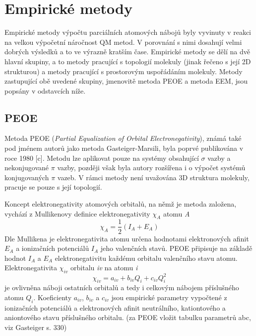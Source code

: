 \section{Empirické metody}
Empirické metody výpočtu parciálních atomových nábojů byly vyvinuty v reakci na velkou výpočetní náročnost QM metod. V porovnání s nimi dosahují velmi dobrých výsledků a to ve výrazně kratším čase. Empirické metody se dělí na dvě hlavní skupiny, a to metody pracující s topologií molekuly (jinak řečeno s její 2D strukturou) a metody pracující s prostorovým uspořádáním molekuly. Metody zastupující obě uvedené skupiny, jmenovitě metoda PEOE a metoda EEM, jsou popsány v odstavcích níže.
\subsection{PEOE}
Metoda PEOE (\textit{Partial Equalization of Orbital Electronegativity}), známá také pod jménem autorů jako metoda Gasteiger-Marsili, byla poprvé publikována v roce 1980 [c]. Metodu lze aplikovat pouze na systémy obsahující $\sigma$ vazby a nekonjugované $\pi$  vazby, později však byla autory rozšířena i o výpočet systémů konjugovaných $\pi$ vazeb. V rámci metody není uvažována 3D struktura molekuly, pracuje se pouze s její topologií. 

Koncept elektronegativity atomových orbitalů, na němž je metoda založena, vychází z Mullikenovy definice elektronegativity $\chi_A$ atomu \textit{A}
\begin{equation}
    \chi_A = \frac{1}{2}(I_A + E_A)
\end{equation}
Dle Mullikena je elektronegativita atomu určena hodnotami elektronových afinit $ E_A$ a ionizačních potenciálů $I_A$ jeho valenčních stavů. PEOE připisuje na základě hodnot $I_A$ a $ E_A$ elektronegativitu každému orbitalu valenčního stavu atomu. Elektronegativita $\chi_{iv}$ orbitalu \textit{iv} na atomu \textit{i}
\begin{equation}
\label{PEOE_elneg}
    \chi_{iv} = a_{iv} + b_{iv}Q_i + c_{iv}Q_i^2
\end{equation}
je ovlivněna náboji ostatních orbitalů a tedy i celkovým nábojem příslušného atomu $Q_i$. Koeficienty $a_{iv}$, $b_{iv}$ a $c_{iv}$ jsou empirické parametry vypočtené z ionizačních potenciálů a elektronových afinit neutrálního, kationtového a aniontového stavu příslušného orbitalu. (za PEOE vložit tabulku parametrů abc, viz Gasteiger s. 330)

